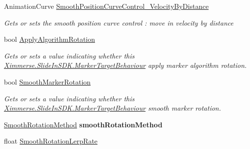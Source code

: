 \begin{DoxyCompactItemize}
Animation\+Curve \mbox{\hyperlink{class_ximmerse_1_1_slide_in_s_d_k_1_1_marker_target_behaviour_a871421f6e07c01117418840c54b1a078}{Smooth\+Position\+Curve\+Control\+\_\+\+Velocity\+By\+Distance}}
\begin{DoxyCompactList}\small\item\em Gets or sets the smooth position curve control \+: move in velocity by distance \end{DoxyCompactList}\item 
bool \mbox{\hyperlink{class_ximmerse_1_1_slide_in_s_d_k_1_1_marker_target_behaviour_ac79c6b47733b2a3eae1a65bd27048d85}{Apply\+Algorithm\+Rotation}}
\begin{DoxyCompactList}\small\item\em Gets or sets a value indicating whether this \mbox{\hyperlink{class_ximmerse_1_1_slide_in_s_d_k_1_1_marker_target_behaviour}{Ximmerse.\+Slide\+In\+S\+D\+K.\+Marker\+Target\+Behaviour}} apply marker algorithm rotation. \end{DoxyCompactList}\item 
bool \mbox{\hyperlink{class_ximmerse_1_1_slide_in_s_d_k_1_1_marker_target_behaviour_ac09ef92989ecda86fbd10fd313983900}{Smooth\+Marker\+Rotation}}
\begin{DoxyCompactList}\small\item\em Gets or sets a value indicating whether this \mbox{\hyperlink{class_ximmerse_1_1_slide_in_s_d_k_1_1_marker_target_behaviour}{Ximmerse.\+Slide\+In\+S\+D\+K.\+Marker\+Target\+Behaviour}} smooth marker rotation. \end{DoxyCompactList}\item 
\mbox{\label{class_ximmerse_1_1_slide_in_s_d_k_1_1_marker_target_behaviour_ab4280bb64f585e55ac9d1207a099bf70}} 
\mbox{\hyperlink{class_ximmerse_1_1_slide_in_s_d_k_1_1_marker_target_behaviour_a1b1d93ad85038ec1f7f0b36dbe2b2e2d}{Smooth\+Rotation\+Method}} {\bfseries smooth\+Rotation\+Method}
\item 
float \mbox{\hyperlink{class_ximmerse_1_1_slide_in_s_d_k_1_1_marker_target_behaviour_a7ed30b92b38582d9f2ca7048f00e0cf2}{Smooth\+Rotation\+Lerp\+Rate}}

\end{DoxyCompactItemize}
